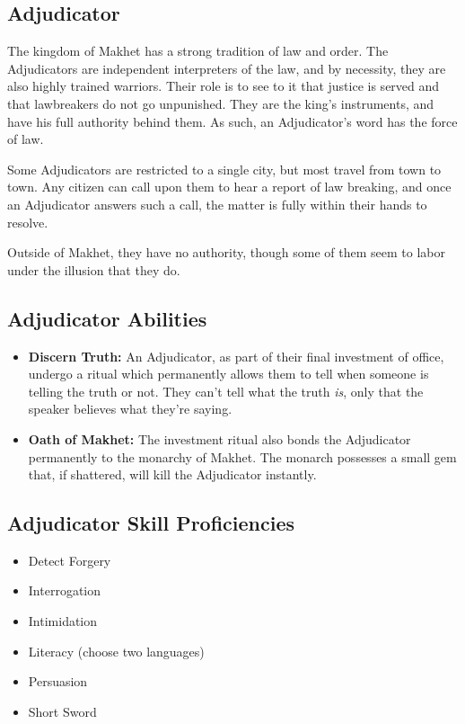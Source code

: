 \begin{multicols}{2}
\section{Adjudicator}

The kingdom of Makhet has a strong tradition of law and order. The
Adjudicators are independent interpreters of the law, and by necessity,
they are also highly trained warriors. Their role is to see to it that
justice is served and that lawbreakers do not go unpunished. They are
the king's instruments, and have his full authority behind them. As
such, an Adjudicator's word has the force of law.

Some Adjudicators are restricted to a single city, but most travel from
town to town. Any citizen can call upon them to hear a report of law
breaking, and once an Adjudicator answers such a call, the matter is
fully within their hands to resolve.

Outside of Makhet, they have no authority, though some of them seem to
labor under the illusion that they do.

\subsection{Adjudicator Abilities}

\begin{itemize}
  \item \textbf{Discern Truth:} An Adjudicator, as part of their final
    investment of office, undergo a ritual which permanently allows them
    to tell when someone is telling the truth or not. They can't tell
    what the truth \textit{is}, only that the speaker believes what
    they're saying.
  \item \textbf{Oath of Makhet:} The investment ritual also bonds the
    Adjudicator permanently to the monarchy of Makhet. The monarch
    possesses a small gem that, if shattered, will kill the Adjudicator
    instantly.
\end{itemize}

\subsection{Adjudicator Skill Proficiencies}

\begin{itemize}
  \item Detect Forgery
  \item Interrogation
  \item Intimidation
  \item Literacy (choose two languages)
  \item Persuasion
  \item Short Sword
\end{itemize}


\end{multicols}
